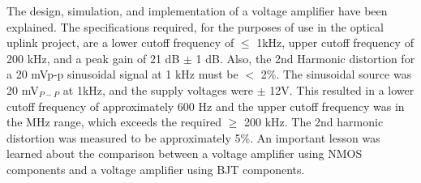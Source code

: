 
	The design, simulation, and implementation of a voltage amplifier have been explained. The specifications required, for the purposes of use in the optical uplink project, are a lower cutoff frequency of $\le$ 1kHz, upper cutoff frequency of 200 kHz, and a peak gain of 21 dB $\pm$ 1 dB. Also, the 2nd Harmonic distortion for a 20 mVp-p sinusoidal signal at 1 kHz must be $<$ 2\%. The sinusoidal source was 20 mV$_{P-P}$ at 1kHz, and the supply voltages were $\pm$ 12V. This resulted in a lower cutoff frequency of approximately 600 Hz and the upper cutoff frequency was in the MHz range, which exceeds the required $\ge$ 200 kHz. The 2nd harmonic distortion was measured to be approximately 5\%. An important lesson was learned about the comparison between a voltage amplifier using NMOS components and a voltage amplifier using BJT components.


